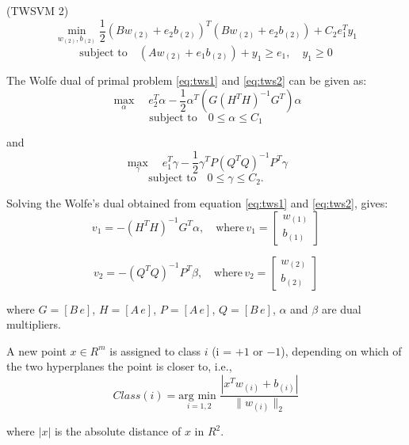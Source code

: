 \documentclass[12pt,a4paper,oneside,english]{report}
\begin{document}
(TWSVM 2)
\begin{equation} \label{eq:tws2}
    \min_{w_{(2)}, b_{(2)}} \frac{1}{2} (Bw_{(2)} + e_2 b_{(2)})^T (Bw_{(2)} + e_2 b_{(2)}) + C_2 e_1^T y_1
\end{equation}
\[
\text{subject to} \quad (Aw_{(2)} + e_1 b_{(2)}) + y_1 \geq e_1, \quad y_1 \geq 0
\]

The Wolfe dual of primal problem \eqref{eq:tws1} and \eqref{eq:tws2} can be given as:
\begin{equation}
    \max_{\alpha} \quad e_2^T \alpha - \frac{1}{2} \alpha^T (G(H^T H)^{-1} G^T) \alpha
\end{equation}
\[
\text{subject to} \quad 0 \leq \alpha \leq C_1
\]

and
\begin{equation}
    \max_{\gamma} \quad e_1^T \gamma - \frac{1}{2} \gamma^T P(Q^T Q)^{-1} P^T \gamma
\end{equation}
\[
\text{subject to} \quad 0 \leq \gamma \leq C_2.
\]

Solving the Wolfe's dual obtained from equation \eqref{eq:tws1} and \eqref{eq:tws2}, gives:
\begin{equation}
    v_1 = -(H^T H)^{-1} G^T \alpha, \quad \text{where} \, v_1 = \begin{bmatrix} w_{(1)} \\ b_{(1)} \end{bmatrix}
\end{equation}

\begin{equation}
    v_2 = -(Q^T Q)^{-1} P^T \beta, \quad \text{where} \, v_2 = \begin{bmatrix} w_{(2)} \\ b_{(2)} \end{bmatrix}
\end{equation}

where \( G = [B \, e] \), \( H = [A \, e] \), \( P = [A \, e] \), \( Q = [B \, e] \), \( \alpha \) and \( \beta \) are dual multipliers.

A new point \( x \in R^m \) is assigned to class \( i \) (i = \( +1 \) or \( -1 \)), depending on which of the two hyperplanes the point is closer to, i.e.,
\begin{equation}
    Class(i) = \underset{i=1,2}{\text{arg min }} \frac{ \left| x^T w_{(i)} + b_{(i)} \right| }{\| w_{(i)} \|_2}
\end{equation}

where \( |x| \) is the absolute distance of \( x \) in \( R^2 \).
\end{document}
